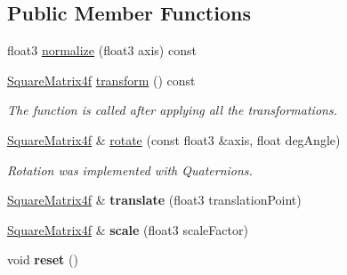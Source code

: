 \subsection*{Public Member Functions}
\begin{DoxyCompactItemize}
\item 
float3 \hyperlink{class_mesh_transformation_a62b90b65ce289707982efdb23a88e517}{normalize} (float3 axis) const
\item 
\hyperlink{class_square_matrix4}{Square\+Matrix4f} \hyperlink{class_mesh_transformation_afd48394eed82a85ca29d05cd4817c29e}{transform} () const\hypertarget{class_mesh_transformation_afd48394eed82a85ca29d05cd4817c29e}{}\label{class_mesh_transformation_afd48394eed82a85ca29d05cd4817c29e}

\begin{DoxyCompactList}\small\item\em The function is called after applying all the transformations. \end{DoxyCompactList}\item 
\hyperlink{class_square_matrix4}{Square\+Matrix4f} \& \hyperlink{class_mesh_transformation_ad14a09457c8d103682183cd8e13b78dc}{rotate} (const float3 \&axis, float deg\+Angle)\hypertarget{class_mesh_transformation_ad14a09457c8d103682183cd8e13b78dc}{}\label{class_mesh_transformation_ad14a09457c8d103682183cd8e13b78dc}

\begin{DoxyCompactList}\small\item\em Rotation was implemented with Quaternions. \end{DoxyCompactList}\item 
\hyperlink{class_square_matrix4}{Square\+Matrix4f} \& {\bfseries translate} (float3 translation\+Point)\hypertarget{class_mesh_transformation_a07eeec7706eaf9e90aaa486664b2632c}{}\label{class_mesh_transformation_a07eeec7706eaf9e90aaa486664b2632c}

\item 
\hyperlink{class_square_matrix4}{Square\+Matrix4f} \& {\bfseries scale} (float3 scale\+Factor)\hypertarget{class_mesh_transformation_ab8dbdbdcaa5e40a7aa234d076b351971}{}\label{class_mesh_transformation_ab8dbdbdcaa5e40a7aa234d076b351971}

\item 
void {\bfseries reset} ()\hypertarget{class_mesh_transformation_a86b8191ff85c6a34e880dcfb582960ca}{}\label{class_mesh_transformation_a86b8191ff85c6a34e880dcfb582960ca}

\end{DoxyCompactItemize}


